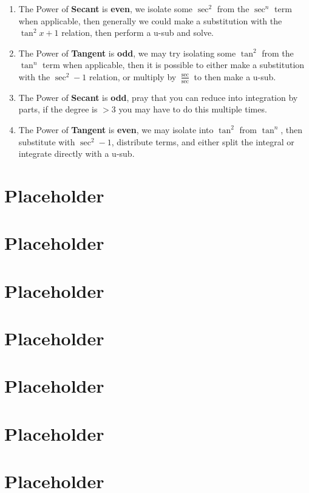 \documentclass[a4paper]{article}
\begin{document}
  \begin{enumerate}
    \item The Power of \textbf{Secant} is \textbf{even}, we isolate some $\sec^2$ from the $\sec^n$ term when applicable, then generally we could make a substitution with the $\tan^2 x +1$ relation, then perform a u-sub and solve.
    \item The Power of \textbf{Tangent} is \textbf{odd}, we may try isolating some $\tan^2$ from the $\tan^n$ term when applicable, then it is possible to either make a substitution with the $\sec^2 - 1$ relation, or multiply by $\frac{\sec }{\sec}$ to then make a u-sub.
    \item The Power of \textbf{Secant} is \textbf{odd}, pray that you can reduce into integration by parts, if the degree is $>$3 you may have to do this multiple times.
    \item The Power of \textbf{Tangent} is \textbf{even}, we may isolate into $\tan^2$ from $\tan^n$, then substitute with $\sec^2 - 1$, distribute terms, and either split the integral or integrate directly with a u-sub.
  \end{enumerate}

  \section{Placeholder} 
  \section{Placeholder} 
  \section{Placeholder} 
  \section{Placeholder} 
  \section{Placeholder} 
  \section{Placeholder} 
  \section{Placeholder} 
\end{document}
